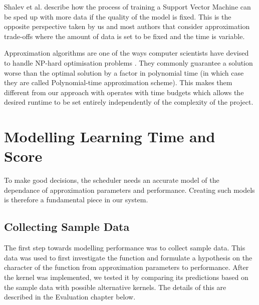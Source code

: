 \documentclass[a4paper,12pt,twoside,openright]{report}
\begin{document}
Shalev et al. \cite{Shalev-Shwartz:2008:SOI:1390156.1390273} describe how the process of training a Support Vector Machine can be sped up with more data if the quality of the model is fixed. This is the opposite perspective taken by us and most authors that consider approximation trade-offs where the amount of data is set to be fixed and the time is variable.

Approximation algorithms are one of the ways computer scientists have devised to handle NP-hard optimisation problems \cite{Vazirani:2001:AA:500776}. They commonly guarantee a solution worse than the optimal solution by a factor in polynomial time (in which case they are called Polynomial-time approximation scheme). This makes them different from our approach with operates with time budgets which allows the desired runtime to be set entirely independently of the complexity of the project.













\chapter{Modelling Learning Time and Score}
To make good decisions, the scheduler needs an accurate model of the dependance of approximation parameters and performance. Creating such models is therefore a fundamental piece in our system.

\section{Collecting Sample Data}
The first step towards modelling performance was to collect sample data. This data was used to first investigate the function and formulate a hypothesis on the character of the function from approximation parameters to performance. After the kernel was implemented, we tested it by comparing its predictions based on the sample data with possible alternative kernels. The details of this are described in the Evaluation chapter below.
\end{document}
